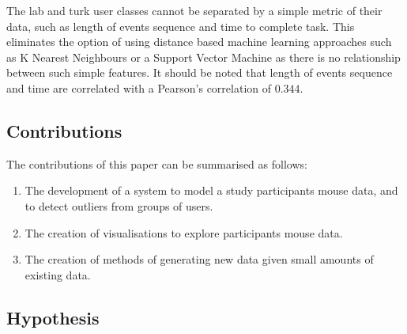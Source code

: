 \documentclass{article}
\begin{document}
The lab and turk user classes cannot be separated by a simple metric of their data, such as length of events sequence and time to complete task.
This eliminates the option of using distance based machine learning approaches such as K Nearest Neighbours or a Support Vector Machine as there is no relationship between such simple features.
It should be noted that length of events sequence and time are correlated with a Pearson's correlation of $0.344$.


\subsection{Contributions}



The contributions of this paper can be summarised as follows:

\begin{enumerate}
    \item The development of a system to model a study participants mouse data, and to detect outliers from groups of users.
    \item The creation of visualisations to explore participants mouse data.
    \item The creation of methods of generating new data given small amounts of existing data.
  \end{enumerate}

\subsection{Hypothesis}
\end{document}
